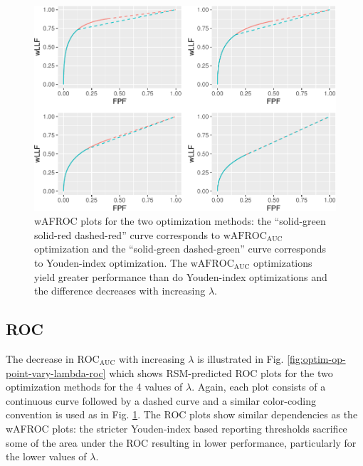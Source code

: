 \documentclass[
]{book}
\begin{document}
\begin{figure}
\centering
\includegraphics{21-optim-op-point_files/figure-latex/optim-op-point-vary-lambda-wafroc-1.pdf}
\caption{\label{fig:optim-op-point-vary-lambda-wafroc}wAFROC plots for the two optimization methods: the ``solid-green solid-red dashed-red'' curve corresponds to \(\text{wAFROC}_\text{AUC}\) optimization and the ``solid-green dashed-green'' curve corresponds to Youden-index optimization. The \(\text{wAFROC}_\text{AUC}\) optimizations yield greater performance than do Youden-index optimizations and the difference decreases with increasing \(\lambda\).}
\end{figure}

\hypertarget{roc-1}{%
\subsection{ROC}\label{roc-1}}

The decrease in \(\text{ROC}_\text{AUC}\) with increasing \(\lambda\) is illustrated in Fig. \ref{fig:optim-op-point-vary-lambda-roc} which shows RSM-predicted ROC plots for the two optimization methods for the 4 values of \(\lambda\). Again, each plot consists of a continuous curve followed by a dashed curve and a similar color-coding convention is used as in Fig. \ref{fig:optim-op-point-vary-lambda-wafroc}. The ROC plots show similar dependencies as the wAFROC plots: the stricter Youden-index based reporting thresholds sacrifice some of the area under the ROC resulting in lower performance, particularly for the lower values of \(\lambda\).
\end{document}
